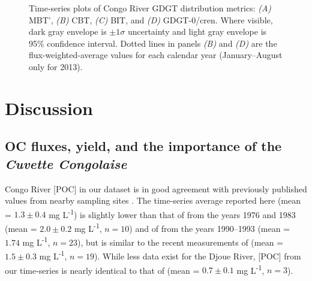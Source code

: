 \begin{figure}[ht]
	\caption[GDGT metric time-series plots]{Time-series plots of Congo River GDGT distribution metrics: \textit{(A)} MBT', \textit{(B)} CBT, \textit{(C)} BIT, and \textit{(D)} GDGT-0/cren. Where visible, dark gray envelope is $\pm 1 \sigma$ uncertainty and light gray envelope is 95\% confidence interval. Dotted lines in panels \textit{(B)} and \textit{(D)} are the flux-weighted-average values for each calendar year (January--August only for 2013).}
	\label{Ch5Fig:4} 
\end{figure}

\section{Discussion}

\subsection{OC fluxes, yield, and the importance of the \textit{Cuvette Congolaise}}

Congo River [POC] in our dataset is in good agreement with previously published values from nearby sampling sites \citep{Mariotti:1991vx,Coynel:2005cn,Spencer:2012en,Spencer:2016ho}. The time-series average reported here (mean = $1.3 \pm 0.4$ mg L\textsuperscript{-1}) is slightly lower than that of \citet{Mariotti:1991vx} from the years 1976 and 1983 (mean = $2.0 \pm 0.2$ mg L\textsuperscript{-1}, $n = 10$) and of \citet{Coynel:2005cn} from the years 1990--1993 (mean = $1.74$ mg L\textsuperscript{-1}, $n = 23$), but is similar to the recent measurements of \citet{Spencer:2012en,Spencer:2016ho} (mean = $1.5 \pm 0.3$ mg L\textsuperscript{-1}, $n = 19$). While less data exist for the Djoue River, [POC] from our time-series is nearly identical to that of \citet{Mariotti:1991vx} (mean = $0.7 \pm 0.1$ mg L\textsuperscript{-1}, $n = 3$).

